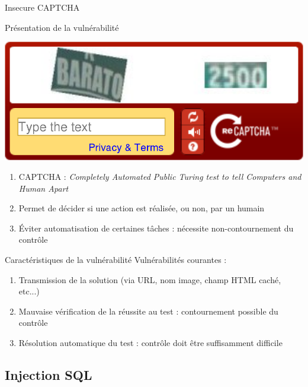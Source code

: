\documentclass[8pt]{beamer}
\begin{document}
\begin{frame}{Insecure CAPTCHA}

\begin{block}{Présentation de la vulnérabilité}

\begin{center}
	\includegraphics[scale=.15]{../images/captcha1.png}
\end{center}

	\begin{enumerate}[\ding{217}]
		\item CAPTCHA :  \textit{Completely Automated Public Turing test to tell Computers and Human Apart}
		\item Permet de décider si une action est réalisée, ou non, par un humain
		\item Éviter automatisation de certaines tâches : nécessite non-contournement du contrôle
	\end{enumerate}
\end{block}

\begin{block}{Caractéristiques de la vulnérabilité}
Vulnérabilités courantes :
	\begin{enumerate}[\ding{217}]
		\item Transmission de la solution (via URL, nom image, champ HTML caché, etc...)
		\item Mauvaise vérification de la réussite au test : contournement possible du contrôle
		\item Résolution automatique du test : contrôle doit être suffisamment difficile
	\end{enumerate}
\end{block}


\end{frame}

\subsection{Injection SQL}
\end{document}
